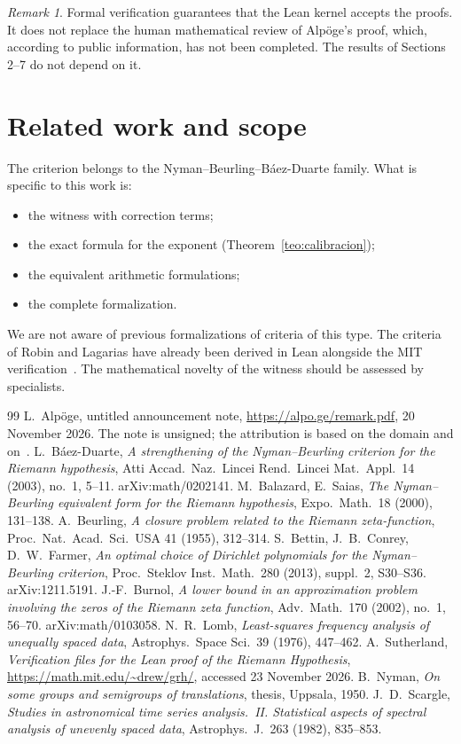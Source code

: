 \documentclass[11pt,a4paper]{amsart}
\theoremstyle{definition}
\theoremstyle{remark}
\newtheorem{remark}[theorem]{Remark}
\begin{document}
\begin{remark}
Formal verification guarantees that the Lean kernel accepts the proofs. It does not replace the human mathematical review of Alp\"oge's proof, which, according to public information, has not been completed. The results of Sections 2--7 do not depend on it.
\end{remark}

\section{Related work and scope}

The criterion belongs to the Nyman--Beurling--B\'aez-Duarte family. What is specific to this work is:
\begin{itemize}
\item the witness with correction terms;
\item the exact formula for the exponent (Theorem~\ref{teo:calibracion});
\item the equivalent arithmetic formulations;
\item the complete formalization.
\end{itemize}
We are not aware of previous formalizations of criteria of this type. The criteria of Robin and Lagarias have already been derived in Lean alongside the MIT verification~\cite{MIT}. The mathematical novelty of the witness should be assessed by specialists.

\begin{thebibliography}{99}
 L.~Alp\"oge, untitled announcement note, \url{https://alpo.ge/remark.pdf}, 20 November 2026. The note is unsigned; the attribution is based on the domain and on~\cite{MIT}.
 L.~B\'aez-Duarte, \emph{A strengthening of the Nyman--Beurling criterion for the Riemann hypothesis}, Atti Accad.\ Naz.\ Lincei Rend.\ Lincei Mat.\ Appl.\ 14 (2003), no.~1, 5--11. arXiv:math/0202141.
 M.~Balazard, E.~Saias, \emph{The Nyman--Beurling equivalent form for the Riemann hypothesis}, Expo.\ Math.\ 18 (2000), 131--138.
 A.~Beurling, \emph{A closure problem related to the Riemann zeta-function}, Proc.\ Nat.\ Acad.\ Sci.\ USA 41 (1955), 312--314.
 S.~Bettin, J.~B.~Conrey, D.~W.~Farmer, \emph{An optimal choice of Dirichlet polynomials for the Nyman--Beurling criterion}, Proc.\ Steklov Inst.\ Math.\ 280 (2013), suppl.~2, S30--S36. arXiv:1211.5191.
 J.-F.~Burnol, \emph{A lower bound in an approximation problem involving the zeros of the Riemann zeta function}, Adv.\ Math.\ 170 (2002), no.~1, 56--70. arXiv:math/0103058.
 N.~R.~Lomb, \emph{Least-squares frequency analysis of unequally spaced data}, Astrophys.\ Space Sci.\ 39 (1976), 447--462.
 A.~Sutherland, \emph{Verification files for the Lean proof of the Riemann Hypothesis}, \url{https://math.mit.edu/~drew/grh/}, accessed 23 November 2026.
 B.~Nyman, \emph{On some groups and semigroups of translations}, thesis, Uppsala, 1950.
 J.~D.~Scargle, \emph{Studies in astronomical time series analysis.~II. Statistical aspects of spectral analysis of unevenly spaced data}, Astrophys.\ J.\ 263 (1982), 835--853.
\end{thebibliography}
\end{document}
